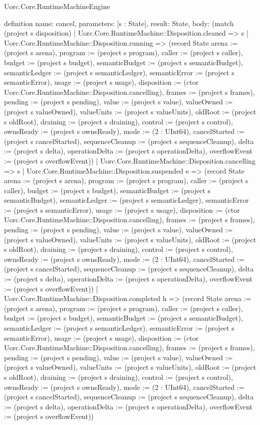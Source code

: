 \begin{lexlean}{Uorc.Core.RuntimeMachineEngine}
\begin{semanticmodule}
definition{
  name: cancel,
  parameters: [s : State],
  result: State,
  body: (match (project s disposition)
    | Uorc.Core.RuntimeMachine::Disposition.cleaned => s
    | Uorc.Core.RuntimeMachine::Disposition.running => (record State {arena := (project s arena), program := (project s program), caller := (project s caller), budget := (project s budget), semanticBudget := (project s semanticBudget), semanticLedger := (project s semanticLedger), semanticError := (project s semanticError), usage := (project s usage), disposition := (ctor Uorc.Core.RuntimeMachine::Disposition.cancelling), frames := (project s frames), pending := (project s pending), value := (project s value), valueOwned := (project s valueOwned), valueUnits := (project s valueUnits), oldRoot := (project s oldRoot), draining := (project s draining), control := (project s control), ownsReady := (project s ownsReady), mode := (2 : UInt64), cancelStarted := (project s cancelStarted), sequenceCleanup := (project s sequenceCleanup), delta := (project s delta), operationDelta := (project s operationDelta), overflowEvent := (project s overflowEvent)})
    | Uorc.Core.RuntimeMachine::Disposition.cancelling => s
    | Uorc.Core.RuntimeMachine::Disposition.suspended e => (record State {arena := (project s arena), program := (project s program), caller := (project s caller), budget := (project s budget), semanticBudget := (project s semanticBudget), semanticLedger := (project s semanticLedger), semanticError := (project s semanticError), usage := (project s usage), disposition := (ctor Uorc.Core.RuntimeMachine::Disposition.cancelling), frames := (project s frames), pending := (project s pending), value := (project s value), valueOwned := (project s valueOwned), valueUnits := (project s valueUnits), oldRoot := (project s oldRoot), draining := (project s draining), control := (project s control), ownsReady := (project s ownsReady), mode := (2 : UInt64), cancelStarted := (project s cancelStarted), sequenceCleanup := (project s sequenceCleanup), delta := (project s delta), operationDelta := (project s operationDelta), overflowEvent := (project s overflowEvent)})
    | Uorc.Core.RuntimeMachine::Disposition.completed h => (record State {arena := (project s arena), program := (project s program), caller := (project s caller), budget := (project s budget), semanticBudget := (project s semanticBudget), semanticLedger := (project s semanticLedger), semanticError := (project s semanticError), usage := (project s usage), disposition := (ctor Uorc.Core.RuntimeMachine::Disposition.cancelling), frames := (project s frames), pending := (project s pending), value := (project s value), valueOwned := (project s valueOwned), valueUnits := (project s valueUnits), oldRoot := (project s oldRoot), draining := (project s draining), control := (project s control), ownsReady := (project s ownsReady), mode := (2 : UInt64), cancelStarted := (project s cancelStarted), sequenceCleanup := (project s sequenceCleanup), delta := (project s delta), operationDelta := (project s operationDelta), overflowEvent := (project s overflowEvent)})
}
\end{semanticmodule}
\end{lexlean}
